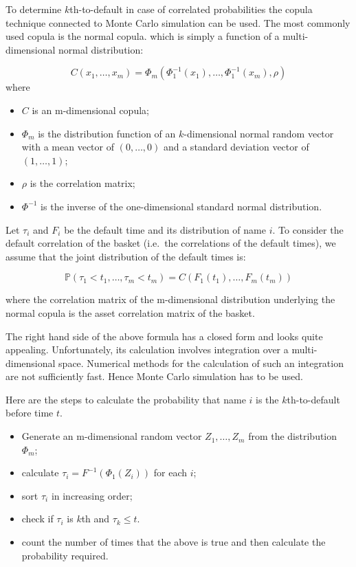To determine \(k\)th-to-default in case of correlated probabilities the
copula technique connected to Monte Carlo simulation can be used. The
most commonly used copula is the normal copula. which is simply a
function of a multi-dimensional normal distribution:

\[C(x_1,\ldots,x_m) = \Phi_m(\Phi^{-1}_1(x_1),\ldots,\Phi^{-1}_1(x_m), \rho) \]
where

\begin{itemize}
\tightlist
\item
  \(C\) is an m-dimensional copula;
\item
  \(\Phi_m\) is the distribution function of an \(k\)-dimensional normal
  random vector with a mean vector of \((0,\ldots,0)\) and a standard
  deviation vector of \((1,\dots,1)\);
\item
  \(\rho\) is the correlation matrix;
\item
  \(\Phi^{-1}\) is the inverse of the one-dimensional standard normal
  distribution.
\end{itemize}

Let \(\tau_i\) and \(F_i\) be the default time and its distribution of
name \(i\). To consider the default correlation of the basket (i.e.~the
correlations of the default times), we assume that the joint
distribution of the default times is:

\[\mathbb{P}(\tau_1 <t_1,\ldots, \tau_m <t_m) = C(F_1(t_1),\ldots, F_m(t_m))\]

where the correlation matrix of the m-dimensional distribution
underlying the normal copula is the asset correlation matrix of the
basket.

The right hand side of the above formula has a closed form and looks
quite appealing. Unfortunately, its calculation involves integration
over a multi-dimensional space. Numerical methods for the calculation of
such an integration are not sufficiently fast. Hence Monte Carlo
simulation has to be used.

Here are the steps to calculate the probability that name \(i\) is the
\(k\)th-to-default before time \(t\).

\begin{itemize}
\tightlist
\item
  Generate an m-dimensional random vector \(Z_1,\ldots,Z_m\) from the
  distribution \(\Phi_m\);
\item
  calculate \(\tau_i=F^{-1}(\Phi_1(Z_i))\) for each \(i\);
\item
  sort \(\tau_i\) in increasing order;
\item
  check if \(\tau_i\) is \(k\)th and \(\tau_k \le t\).
\item
  count the number of times that the above is true and then calculate
  the probability required.
\end{itemize}

